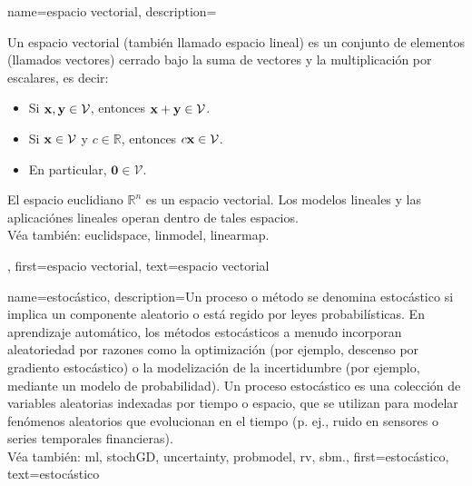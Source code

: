 
{name={espacio vectorial},
	description={Un espacio vectorial (también llamado espacio lineal) es un conjunto de elementos (llamados vectores) cerrado bajo la suma de vectores y la multiplicación por escalares, es decir:
		\begin{itemize}
			\item Si ${\bf x}, {\bf y} \in \mathcal{V}$, entonces ${\bf x} + {\bf y} \in \mathcal{V}$.
			\item Si ${\bf x} \in \mathcal{V}$ y $c \in \mathbb{R}$, entonces $c {\bf x} \in \mathcal{V}$.
			\item En particular, $\mathbf{0} \in \mathcal{V}$.
		\end{itemize}
		El espacio euclidiano $\mathbb{R}^n$ es un espacio vectorial.
		Los modelos lineales y las aplicaciónes lineales operan dentro de tales espacios.\\
		Véa también: \gls{euclidspace}, \gls{linmodel}, \gls{linearmap}.},
	first={espacio vectorial},
	text={espacio vectorial}
}


{name={estocástico},
	description={Un proceso o método se denomina estocástico si implica 
		un componente aleatorio o está regido por leyes probabilísticas. En aprendizaje automático, los métodos 
		estocásticos a menudo incorporan aleatoriedad por razones como la optimización (por ejemplo, 
		descenso por gradiento estocástico) o la modelización de la incertidumbre (por ejemplo, mediante 
		un modelo de probabilidad). Un proceso estocástico es una colección de variables aleatorias indexadas por tiempo 
		o espacio, que se utilizan para modelar fenómenos aleatorios que evolucionan en el tiempo 
		(p. ej., ruido en sensores o series temporales financieras).\\
		Véa también: \gls{ml}, \gls{stochGD}, \gls{uncertainty}, \gls{probmodel}, \gls{rv}, \gls{sbm}.},
	first={estocástico},
	text={estocástico}
}

